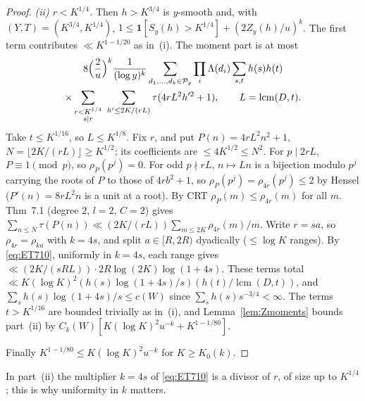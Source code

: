\documentclass[10pt,reqno]{amsart}
\theoremstyle{definition}
\theoremstyle{remark}
\newcommand{\cP}{\mathcal P}
\newcommand{\ind}{\mathbf 1}
\newcommand{\lcm}{\operatorname{lcm}}
\begin{document}
\begin{proof}
\emph{(ii) $r<K^{1/4}$.}  Then $h>K^{3/4}$ is $y$-smooth and, with
$(Y,T)=(K^{3/4},K^{1/4})$, $1\leq\ind[S_y(h)>K^{1/4}]+(2Z_y(h)/u)^k$.  The first
term contributes $\ll K^{1-1/20}$ as in~(i).  The moment part is at most
\begin{multline*}
 8\Bigl(\frac2u\Bigr)^k\frac1{(\log y)^k}\sum_{d_1,\dots,d_k\in\cP_y}\prod_i\Lambda(d_i)\sum_{s,t}h(s)h(t)\\
 \times\sum_{\substack{r<K^{1/4}\\ s\mid r}}\ \sum_{h'\leq2K/(rL)}\tau(4rL^2h'^2+1),\qquad L=\lcm(D,t).
\end{multline*}
Take $t\leq K^{1/16}$, so $L\leq K^{1/8}$.  Fix $r$, and put $P(n)=4rL^2n^2+1$,
$N=\lfloor2K/(rL)\rfloor\geq K^{1/2}$; its coefficients are $\leq4K^{1/2}\leq N^2$.  For
$p\mid2rL$, $P\equiv1\pmod p$, so $\rho_P(p^j)=0$.  For odd $p\nmid rL$, $n\mapsto Ln$
is a bijection modulo $p^j$ carrying the roots of $P$ to those of $4rb^2+1$,
so $\rho_P(p^j)=\rho_{4r}(p^j)\leq2$ by Hensel ($P'(n)=8rL^2n$ is a unit at a root).
By CRT $\rho_P(m)\leq\rho_{4r}(m)$ for all $m$.  Thm~7.1 (degree $2$, $l=2$,
$C=2$) gives $\sum_{n\leq N}\tau(P(n))\ll(2K/(rL))\sum_{m\leq2K}\rho_{4r}(m)/m$.  Write
$r=sa$, so $\rho_{4r}=\rho_{ka}$ with $k=4s$, and split $a\in[R,2R)$ dyadically
($\leq\log K$ ranges).  By \eqref{eq:ET710}, uniformly in $k=4s$, each range
gives $\ll(2K/(sRL))\cdot2R\log(2K)\log(1+4s)$.  These terms total
$\ll K(\log K)^2(h(s)\log(1+4s)/s)(h(t)/\lcm(D,t))$, and
$\sum_sh(s)\log(1+4s)/s\leq c(W)$ since $\sum_sh(s)s^{-3/4}<\infty$.  The terms
$t>K^{1/16}$ are bounded trivially as in~(i), and Lemma~\ref{lem:Zmoments}
bounds part~(ii) by $C_k(W)[K(\log K)^2u^{-k}+K^{1-1/80}]$.

Finally $K^{1-1/80}\leq K(\log K)^2u^{-k}$ for $K\geq K_0(k)$.
\end{proof}
In part~(ii) the multiplier $k=4s$ of \eqref{eq:ET710} is a divisor of $r$,
of size up to $K^{1/4}$; this is why uniformity in $k$ matters.
\end{document}
